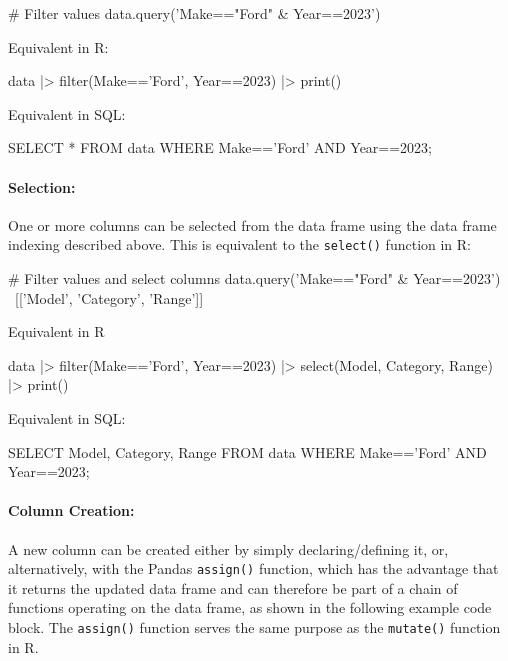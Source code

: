 \begin{pythoncode}
# Filter values
data.query('Make=="Ford" & Year==2023')
\end{pythoncode}

\begin{multicols}{2}
Equivalent in R:
\begin{Rcode}
data |> 
  filter(Make=='Ford', 
         Year==2023) |> 
  print()
\end{Rcode}

Equivalent in SQL:
\begin{sqlcode}
SELECT * 
   FROM data 
   WHERE Make=='Ford' AND 
         Year==2023;
\end{sqlcode}
\end{multicols}

\paragraph*{Selection:} One or more columns can be selected from the data frame using the data frame indexing described above. This is equivalent to the \texttt{select()} function in R:

\begin{pythoncode}
# Filter values and select columns
data.query('Make=="Ford" & Year==2023') \
    [['Model', 'Category', 'Range']]
\end{pythoncode}

\begin{multicols}{2}
Equivalent in R
\begin{Rcode}
data |> 
  filter(Make=='Ford', 
         Year==2023) |> 
  select(Model, Category, 
            Range) |>
  print()
\end{Rcode}

Equivalent in SQL:

\begin{sqlcode}
SELECT Model, Category, Range 
   FROM data 
   WHERE Make=='Ford' AND 
         Year==2023;
\end{sqlcode}
\end{multicols}

\paragraph*{Column Creation:} A new column can be created either by simply declaring/defining it, or, alternatively, with the Pandas \texttt{assign()} function, which has the advantage that it returns the updated data frame and can therefore be part of a chain of functions operating on the data frame, as shown in the following example code block. The \texttt{assign()} function serves the same purpose as the \texttt{mutate()} function in R.

